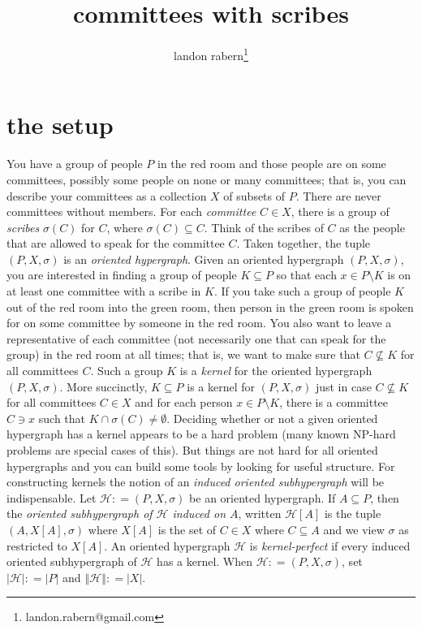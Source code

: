 \documentclass[12pt]{article}
\title{committees with scribes}
\author{landon rabern\thanks{landon.rabern@gmail.com}}
\newcommand{\fancy}[1]{\mathcal{#1}}
\newcommand{\HH}{\fancy{H}}
\newcommand{\card}[1]{\left|#1\right|}
\newcommand{\size}[1]{\left\Vert#1\right\Vert}
\newcommand{\brackets}[1]{\left[ #1 \right]}
\newcommand{\DefinedAs}{\mathrel{\mathop:}=}
\def\s{\sigma}
\begin{document}
\maketitle

\section*{the setup}
You have a group of people $P$ in the red room and those people are on some committees, possibly some people on none or many committees; that is, you can describe your
committees as a collection $X$ of subsets of $P$.  There are never committees without members. For each \emph{committee} $C \in X$, there is a group of \emph{scribes} $\s(C)$ for $C$,  where $\s(C) \subseteq C$.
Think of the scribes of $C$ as the people that are allowed to speak for the committee $C$.
Taken together, the tuple $(P,X,\sigma)$ is an \emph{oriented hypergraph}.  Given an oriented hypergraph $(P,X,\sigma)$, you are interested in finding a
group of people $K \subseteq P$ so that each $x \in P \setminus K$ is on at least one committee with a scribe in $K$.  
If you take such a group of people $K$ out of the red room into the green room,
then person in the green room is spoken for on some committee by someone in the red room. 
You also want to leave a representative of each committee (not necessarily one that can speak for the group) in the red room
at all times; that is, we want to make sure that $C \not \subseteq K$ for all committees $C$.  Such a group $K$ is a \emph{kernel} for the oriented hypergraph $(P,X,\sigma)$.  
More succinctly, $K \subseteq P$ is a kernel for $(P,X,\sigma)$ just in case $C \not \subseteq K$ for all committees $C \in X$ and for each person $x\in P\setminus K$, there is a committee $C \ni x$ such that $K \cap \sigma(C) \ne \emptyset$.  Deciding
whether or not a given oriented hypergraph has a kernel appears to be a hard problem (many known NP-hard problems are special cases of this).  But things are not hard for
all oriented hypergraphs and you can build some tools by looking for useful structure.  For constructing kernels the notion of an \emph{induced oriented subhypergraph} will be indispensable.
Let $\HH \DefinedAs (P,X,\sigma)$ be an oriented hypergraph.  If $A \subseteq P$, then the \emph{oriented subhypergraph of $\HH$ induced on $A$}, written $\HH[A]$ is the tuple 
$(A, X\brackets{A}, \sigma)$ where $X\brackets{A}$ is the set of $C \in X$ where $C \subseteq A$ and we view $\sigma$ as restricted to $X\brackets{A}$.  
An oriented hypergraph $\HH$ is \emph{kernel-perfect} if every induced oriented subhypergraph of $\HH$ has a kernel.  When $\HH \DefinedAs (P,X,\sigma)$, set $\card{\HH} \DefinedAs \card{P}$
and $\size{\HH} \DefinedAs \card{X}$.
\end{document}
